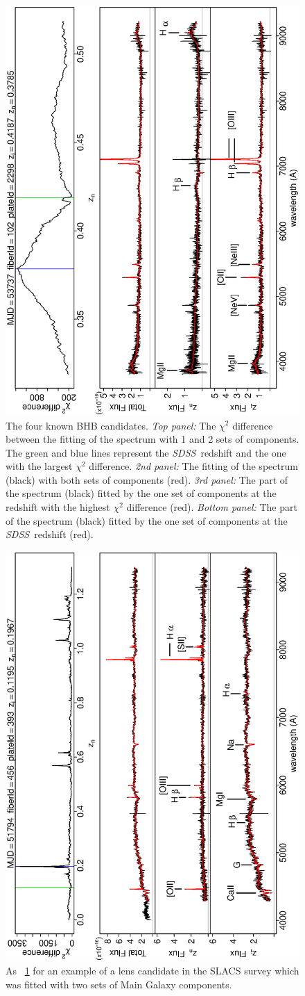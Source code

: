\documentclass[12pt,preprint]{aastex}
\newcommand{\project}[1]{\textsl{#1}}
\newcommand{\sdss}{\project{SDSS}}
\newcommand{\SDSS}{\sdss}
\begin{document}
\begin{figure}
\includegraphics[angle=-90,width=0.49\columnwidth]{paper_plots/paper_bhb102}
\caption{The four known BHB candidates. \textsl{Top panel:} The
  $\chi^2$ difference between the fitting of the spectrum with 1 and 2
  sets of components. The green and blue lines represent the \SDSS\  
  redshift and the one with the largest $\chi^2$
  difference. \textsl{2nd panel:} The fitting of the spectrum (black)
  with both sets of components (red). \textsl{3rd panel:} The part of
  the spectrum (black) fitted by the one set of components at the
  redshift with the highest $\chi^2$ difference (red). \textsl{Bottom
    panel:} The part of the spectrum (black) fitted by the one set of
  components at the \SDSS\ redshift (red).}
\label{fig:6a}
\end{figure}

\clearpage
\begin{figure}
\includegraphics[angle=-90,width=0.49\columnwidth]{paper_plots/paper_13gg}
\caption{As \figurename~\ref{fig:6a} for an example of a lens candidate in the SLACS survey
  which was fitted with two sets of Main Galaxy components.}
\label{fig:6}
\end{figure}
\end{document}
